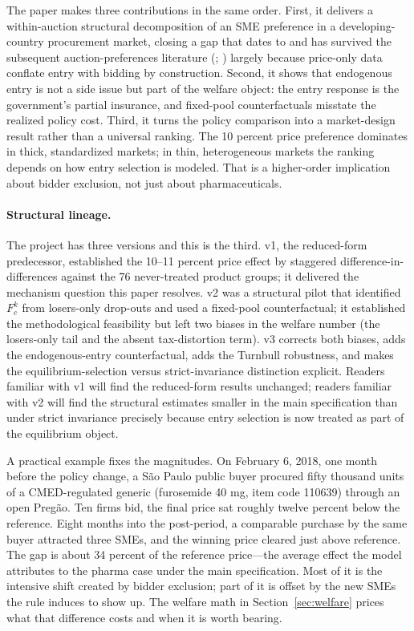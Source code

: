 The paper makes three contributions in the same order. First, it delivers a within-auction structural decomposition of an SME preference in a developing-country procurement market, closing a gap that dates to \citet{marion2007} and has survived the subsequent auction-preferences literature (\citealp{athey2013}; \citealp{nakabayashi2013}) largely because price-only data conflate entry with bidding by construction. Second, it shows that endogenous entry is not a side issue but part of the welfare object: the entry response is the government's partial insurance, and fixed-pool counterfactuals misstate the realized policy cost. Third, it turns the policy comparison into a market-design result rather than a universal ranking. The 10 percent price preference dominates in thick, standardized markets; in thin, heterogeneous markets the ranking depends on how entry selection is modeled. That is a higher-order implication about bidder exclusion, not just about pharmaceuticals.

\paragraph{Structural lineage.} The project has three versions and this is the third. v1, the reduced-form predecessor, established the 10--11 percent price effect by staggered difference-in-differences against the 76 never-treated product groups; it delivered the mechanism question this paper resolves. v2 was a structural pilot that identified $F_c^k$ from losers-only drop-outs and used a fixed-pool counterfactual; it established the methodological feasibility but left two biases in the welfare number (the losers-only tail and the absent tax-distortion term). v3 corrects both biases, adds the endogenous-entry counterfactual, adds the Turnbull robustness, and makes the equilibrium-selection versus strict-invariance distinction explicit. Readers familiar with v1 will find the reduced-form results unchanged; readers familiar with v2 will find the structural estimates smaller in the main specification than under strict invariance precisely because entry selection is now treated as part of the equilibrium object.

A practical example fixes the magnitudes. On February 6, 2018, one month before the policy change, a S\~ao Paulo public buyer procured fifty thousand units of a CMED-regulated generic (furosemide 40 mg, item code 110639) through an open Preg\~ao. Ten firms bid, the final price sat roughly twelve percent below the reference. Eight months into the post-period, a comparable purchase by the same buyer attracted three SMEs, and the winning price cleared just above reference. The gap is about 34 percent of the reference price---the average effect the model attributes to the pharma case under the main specification. Most of it is the intensive shift created by bidder exclusion; part of it is offset by the new SMEs the rule induces to show up. The welfare math in Section~\ref{sec:welfare} prices what that difference costs and when it is worth bearing.

